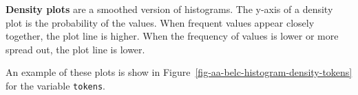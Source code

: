 \documentclass[
  letterpaper,
]{latex/krantz}
\theoremstyle{definition}
\theoremstyle{remark}
\begin{document}
\textbf{Density plots} are a smoothed version of histograms. The y-axis
of a density plot is the probability of the values. When frequent values
appear closely together, the plot line is higher. When the frequency of
values is lower or more spread out, the plot line is lower.

An example of these plots is show in
Figure~\ref{fig-aa-belc-histogram-density-tokens} for the variable
\texttt{tokens}.

\begin{figure}[H]

\begin{minipage}{0.50\linewidth}



\end{minipage}%
%
\begin{minipage}{0.50\linewidth}

\centering{

}
\end{minipage}
\end{figure}
\end{document}
